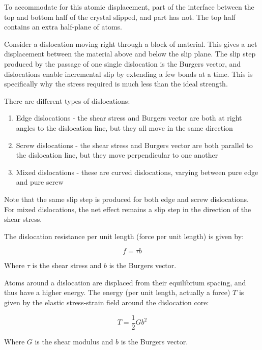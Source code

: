 \documentclass{article}
\begin{document}
To accommodate  for this atomic displacement, part of the interface between the top and bottom half of the crystal slipped, and part has not. The top half contains an extra half-plane of atoms. 

Consider a dislocation moving right through a block of material. This gives a net displacement between the material above and below the slip plane. The slip step produced by the passage of one single dislocation is the Burgers vector, and dislocations enable incremental slip by extending a few  bonds at a time. This is specifically why the stress required is much less than the ideal strength.

There are different types of dislocations:

\begin{enumerate}
    \item Edge dislocations - the shear stress and Burgers vector are both at right angles to the dislocation line, but they all move in the same direction
    \item Screw dislocations - the shear stress and Burgers vector are  both parallel to the dislocation line, but they move perpendicular to one another
    \item Mixed dislocations - these are curved dislocations, varying between pure edge and pure screw
\end{enumerate}

Note that the same slip step is produced for both edge and screw dislocations. For mixed dislocations, the net effect remains a slip step in the direction of the shear stress.

\begin{proposition}
    The dislocation resistance per unit length (force per unit length) is given by:

    \[ f = \tau b \]

    Where $\tau$ is the shear stress and $b$ is the Burgers vector.
\end{proposition}

\begin{proposition}
    Atoms around a dislocation are displaced from their equilibrium spacing, and thus have a higher energy. The energy (per unit length, actually a force) $T$ is given by the elastic stress-strain field around the dislocation core:

    \[ T = \frac{1}{2}Gb^2 \]

    Where $G$ is the shear modulus and $b$ is the Burgers vector.
\end{proposition}
\end{document}
